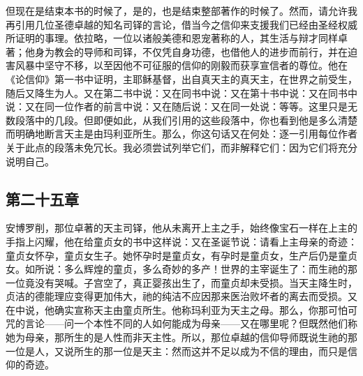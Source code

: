 但现在是结束本书的时候了，是的，也是结束整部著作的时候了。然而，请允许我再引用几位圣德卓越的知名司铎的言论，借当今之信仰来支援我们已经由圣经权威所证明的事理。依拉略，一位以诸般美德和恩宠著称的人，其生活与辩才同样卓著；他身为教会的导师和司铎，不仅凭自身功德，也借他人的进步而前行，并在迫害风暴中坚守不移，以至因他不可征服的信仰的刚毅而获享宣信者的尊位。他在《论信仰》第一书中证明，主耶稣基督，出自真天主的真天主，在世界之前受生，随后又降生为人。又在第二书中说：又在同书中说：又在第十书中说：又在同书中说：又在同一位作者的前言中说：又在随后说：又在同一处说：等等。这里只是无数段落中的几段。但即便如此，从我们引用的这些段落中，你也看到他是多么清楚而明确地断言天主是由玛利亚所生。那么，你这句话又在何处：逐一引用每位作者关于此点的段落未免冗长。我必须尝试列举它们，而非解释它们：因为它们将充分说明自己。\par


\subsection{第二十五章}

\par

安博罗削，那位卓著的天主司铎，他从未离开上主之手，始终像宝石一样在上主的手指上闪耀，他在给童贞女的书中这样说：又在圣诞节说：请看上主母亲的奇迹：童贞女怀孕，童贞女生子。她怀孕时是童贞女，有孕时是童贞女，生产后仍是童贞女。如所说：多么辉煌的童贞，多么奇妙的多产！世界的主宰诞生了：而生祂的那一位竟没有哭喊。子宫空了，真正婴孩出生了，而童贞却未受损。当天主降生时，贞洁的德能理应变得更加伟大，祂的纯洁不应因那来医治败坏者的离去而受损。又在中说，他确实宣称天主由童贞所生。他称玛利亚为天主之母。那么，你那可怕可咒的言论——问一个本性不同的人如何能成为母亲——又在哪里呢？但既然他们称她为母亲，那所生的是人性而非天主性。所以，那位卓越的信仰导师既说生祂的那一位是人，又说所生的那一位是天主：然而这并不足以成为不信的理由，而只是信仰的奇迹。\par

